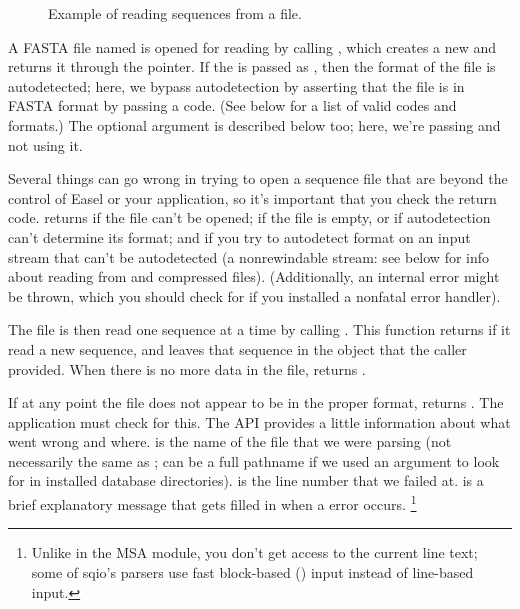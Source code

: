 \begin{figure}

\caption{Example of reading sequences from a file.}
\label{fig:sqio_example}
\end{figure}

A FASTA file named  is opened for reading by calling
, which
creates a new  and returns it through the
 pointer. If the  is passed as
, then the format of the file is
autodetected; here, we bypass autodetection by asserting that the file
is in FASTA format by passing a  code. (See
below for a list of valid codes and formats.) The optional 
argument is described below too; here, we're passing  and
not using it.

Several things can go wrong in trying to open a sequence file that are
beyond the control of Easel or your application, so it's important
that you check the return code.   returns
 if the file can't be opened; 
if the file is empty, or if autodetection can't determine its format;
and  if you try to autodetect format on an input
stream that can't be autodetected (a nonrewindable stream: see below
for info about reading from  and compressed
files). (Additionally, an internal error might be thrown, which you
should check for if you installed a nonfatal error handler).

The file is then read one sequence at a time by calling
. This function returns 
if it read a new sequence, and leaves that sequence in the 
object that the caller provided.  When there is no more data in the
file,  returns . 

If at any point the file does not appear to be in the proper format,
 returns . The application
must check for this. The API provides a little information about what
went wrong and where.  is the name of the file
that we were parsing (not necessarily the same as ;
 can be a full pathname if we used an
 argument to look for  in installed database
directories).  is the line number that we
failed at.  is a brief explanatory message that
gets filled in when a  error occurs.
  \footnote{Unlike in the MSA module, you don't get access to the
  current line text; some of sqio's parsers use fast block-based
  () input instead of line-based input.}

